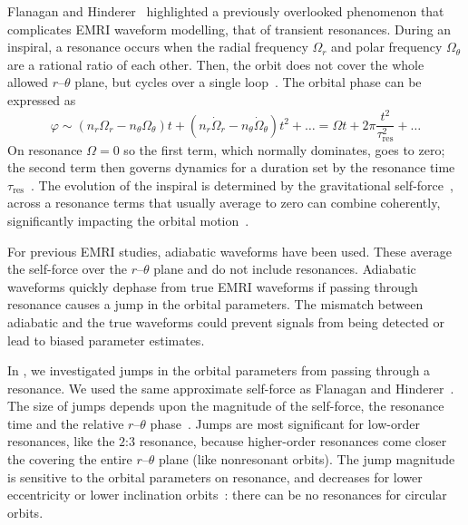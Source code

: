 \documentclass[a4paper]{jpconf}
\begin{document}
Flanagan and Hinderer~\cite{Flanagan2012} highlighted a previously overlooked phenomenon that complicates EMRI waveform modelling, that of transient resonances. During an inspiral, a resonance occurs when the radial frequency $\Omega_r$ and polar frequency $\Omega_\theta$ are a rational ratio of each other. Then, the orbit does not cover the whole allowed $r$--$\theta$ plane, but cycles over a single loop~\cite{Grossman2012}. The orbital phase can be expressed as
\begin{equation}
\varphi {} \sim {} \left(n_r \Omega_r - n_\theta \Omega_\theta\right) t + \left(n_r \dot{\Omega}_r - n_\theta \dot{\Omega}_\theta\right)t^2 + \ldots = \Omega t + 2\pi \frac{t^2}{\tau_\mathrm{res}^2} + \ldots
\end{equation}
On resonance $\Omega = 0$ so the first term, which normally dominates, goes to zero; the second term then governs dynamics for a duration set by the resonance time $\tau_\mathrm{res}$~\cite{Ruangsri2014,Berry2016a}. The evolution of the inspiral is determined by the gravitational self-force~\cite{Barack2009}, across a resonance terms that usually average to zero can combine coherently, significantly impacting the orbital motion~\cite{Flanagan2012}.

For previous EMRI studies, adiabatic waveforms have been used. These average the self-force over the $r$--$\theta$ plane and do not include resonances. Adiabatic waveforms quickly dephase from true EMRI waveforms if passing through resonance causes a jump in the orbital parameters. The mismatch between adiabatic and the true waveforms could prevent signals from being detected or lead to biased parameter estimates.

In \cite{Berry2016a}, we investigated jumps in the orbital parameters from passing through a resonance. We used the same approximate self-force as Flanagan and Hinderer~\cite{Flanagan2012}. The size of jumps depends upon the magnitude of the self-force, the resonance time and the relative $r$--$\theta$ phase~\cite{Kevorkian1987,VanDeMeent2013,Berry2016a}. Jumps are most significant for low-order resonances, like the $2$:$3$ resonance, because higher-order resonances come closer the covering the entire $r$--$\theta$ plane (like nonresonant orbits). The jump magnitude is sensitive to the orbital parameters on resonance, and decreases for lower eccentricity or lower inclination orbits~\cite{Flanagan2012a}: there can be no resonances for circular orbits.

\end{document}
